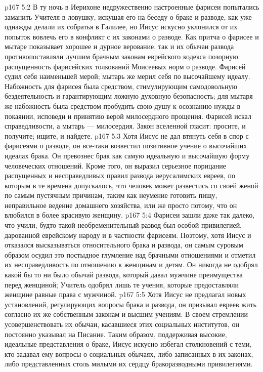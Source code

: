 \vs p167 5:2 \pc В ту ночь в Иерихоне недружественно настроенные фарисеи попытались заманить Учителя в ловушку, искушая его на беседу о браке и разводе, как уже однажды делали их собратья в Галилее, но Иисус искусно уклонился от их попыток вовлечь его в конфликт с их законами о разводе. Как притча о фарисее и мытаре показывает хорошее и дурное верование, так и их обычаи развода противопоставляли лучшим брачным законам еврейского кодекса позорную распущенность фарисейских толкований Моисеевых норм о разводе. Фарисей судил себя наименьшей мерой; мытарь же мерил себя по высочайшему идеалу. Набожность для фарисея была средством, стимулирующим самодовольную бездеятельность и гарантирующим ложную духовную безопасность; для мытаря же набожность была средством пробудить свою душу к осознанию нужды в покаянии, исповеди и принятию верой милосердного прощения. Фарисей искал справедливости, а мытарь --- милосердия. Закон вселенной гласит: просите, и получите; ищите, и найдете.
\vs p167 5:3 Хотя Иисус не дал втянуть себя в спор с фарисеями о разводе, он все\hyp{}таки возвестил позитивное учение о высочайших идеалах брака. Он превознес брак как самую идеальную и высочайшую форму человеческих отношений. Кроме того, он выразил серьезное порицание распущенных и несправедливых правил развода иерусалимских евреев, по которым в те времена допускалось, что человек может развестись со своей женой по самым пустячным причинам, таким как неумение готовить пищу, неправильное ведение домашнего хозяйства, или же просто потому, что он влюбился в более красивую женщину.
\vs p167 5:4 Фарисеи зашли даже так далеко, что учили, будто такой необременительный развод был особой привилегией, дарованной еврейскому народу и в частности фарисеям. Поэтому, хотя Иисус и отказался высказываться относительного брака и развода, он самым суровым образом осудил это постыдное глумление над брачными отношениями и отметил их несправедливость по отношению к женщинам и детям. Он никогда не одобрял какой бы то ни было обычай развода, который давал мужчине преимущества перед женщиной; Учитель одобрял лишь те учения, которые предоставляли женщине равные права с мужчиной.
\vs p167 5:5 Хотя Иисус не предлагал новых установлений, регулирующих вопросы брака и развода, он призывал евреев жить согласно их же собственным законам и высшим учениям. В своем стремлении усовершенствовать их обычаи, касавшиеся этих социальных институтов, он постоянно указывал на Писание. Таким образом, поддерживая высокие, идеальные представления о браке, Иисус искусно избегал столкновений с теми, кто задавал ему вопросы о социальных обычаях, либо записанных в их законах, либо представленных столь милыми их сердцу бракоразводными привилегиями.
